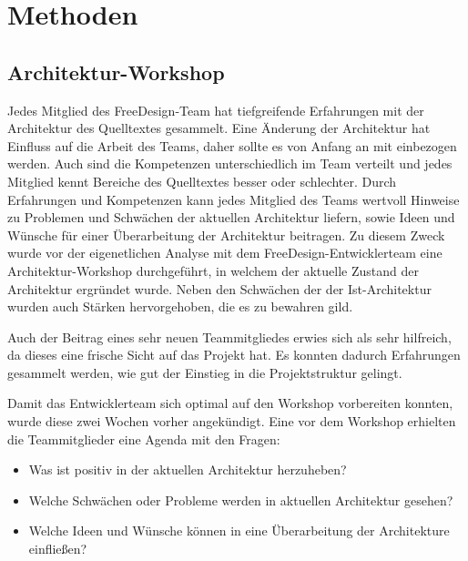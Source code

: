 \chapter{Methoden}

\section{Architektur-Workshop}
Jedes Mitglied des FreeDesign-Team hat tiefgreifende Erfahrungen mit der Architektur des Quelltextes gesammelt. %
Eine Änderung der Architektur hat Einfluss auf die Arbeit des Teams, daher sollte es von Anfang an mit einbezogen werden. 
Auch sind die Kompetenzen unterschiedlich im Team verteilt und jedes Mitglied kennt Bereiche des Quelltextes besser oder schlechter. 
Durch Erfahrungen und Kompetenzen kann jedes Mitglied des Teams wertvoll Hinweise zu Problemen und Schwächen der aktuellen Architektur liefern, sowie Ideen und Wünsche für einer Überarbeitung der Architektur beitragen.
Zu diesem Zweck wurde vor der eigenetlichen Analyse mit dem FreeDesign-Entwicklerteam eine Architektur-Workshop durchgeführt, in welchem der aktuelle Zustand der Architektur ergründet wurde. Neben den Schwächen der der Ist-Architektur wurden auch Stärken hervorgehoben, die es zu bewahren gild. 

Auch der Beitrag eines sehr neuen Teammitgliedes erwies sich als sehr hilfreich, da dieses eine frische Sicht auf das Projekt hat. Es konnten dadurch Erfahrungen gesammelt werden, wie gut der Einstieg in die Projektstruktur gelingt. 

Damit das Entwicklerteam sich optimal auf den Workshop vorbereiten konnten, wurde diese zwei Wochen vorher angekündigt. Eine vor dem Workshop erhielten die Teammitglieder eine Agenda mit den Fragen:
\begin{itemize}
	\item Was ist positiv in der aktuellen Architektur herzuheben?
	\item Welche Schwächen oder Probleme werden in aktuellen Architektur gesehen?
	\item Welche Ideen und Wünsche können in eine Überarbeitung der Architekture einfließen?
\end{itemize}

